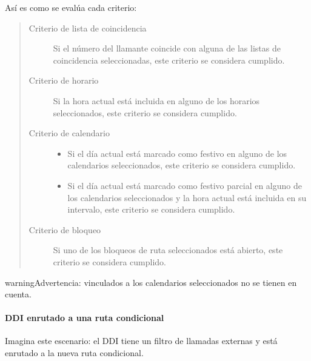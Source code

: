 \documentclass[letterpaper,10pt,spanish]{sphinxmanual}
\begin{document}
Así es como se evalúa cada criterio:
\begin{quote}
\begin{description}
\item[{Criterio de lista de coincidencia}] \leavevmode
Si el número del llamante coincide con alguna de las listas de coincidencia seleccionadas, este criterio se considera cumplido.

\item[{Criterio de horario}] \leavevmode
Si la hora actual está incluida en alguno de los horarios seleccionados, este criterio se considera cumplido.

\item[{Criterio de calendario}] \leavevmode\begin{itemize}
\item {} 
Si el día actual está marcado como festivo en alguno de los calendarios seleccionados, este criterio se considera cumplido.

\item {} 
Si el día actual está marcado como festivo parcial en alguno de los calendarios seleccionados y la hora actual está incluida en su intervalo, este criterio se considera cumplido.

\end{itemize}

\item[{Criterio de bloqueo}] \leavevmode
Si uno de los bloqueos de ruta seleccionados está abierto, este criterio se considera cumplido.

\end{description}
\end{quote}

\begin{notice}{warning}{Advertencia:}
{\hyperref[administration_portal/client/vpbx/routing_tools/calendars:special\string-schedules]{}} vinculados a los calendarios seleccionados no se tienen en cuenta.
\end{notice}


\paragraph{DDI enrutado a una ruta condicional}
\label{administration_portal/client/vpbx/routing_endpoints/conditional_routes:ddi-routed-to-a-conditional-route}
Imagina este escenario: el DDI tiene un filtro de llamadas externas y está enrutado a la nueva ruta condicional.
\end{document}
